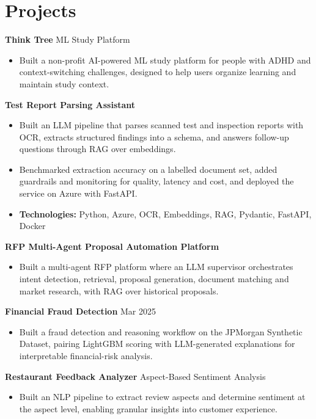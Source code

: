 \documentclass[10pt,a4paper]{article}
\begin{document}
\section{Projects}
\textbf{Think Tree} \textbar{} ML Study Platform\par
\begin{itemize}
  \item Built a non-profit AI-powered ML study platform for people with ADHD and context-switching challenges, designed to help users organize learning and maintain study context.
\end{itemize}
\textbf{Test Report Parsing Assistant}\par
\begin{itemize}
  \item Built an LLM pipeline that parses scanned test and inspection reports with OCR, extracts structured findings into a schema, and answers follow-up questions through RAG over embeddings.
  \item Benchmarked extraction accuracy on a labelled document set, added guardrails and monitoring for quality, latency and cost, and deployed the service on Azure with FastAPI.
  \item \textbf{Technologies:} Python, Azure, OCR, Embeddings, RAG, Pydantic, FastAPI, Docker
\end{itemize}
\textbf{RFP Multi-Agent Proposal Automation Platform}\par
\begin{itemize}
  \item Built a multi-agent RFP platform where an LLM supervisor orchestrates intent detection, retrieval, proposal generation, document matching and market research, with RAG over historical proposals.
\end{itemize}
\textbf{Financial Fraud Detection} \textbar{} Mar 2025\par
\begin{itemize}
  \item Built a fraud detection and reasoning workflow on the JPMorgan Synthetic Dataset, pairing LightGBM scoring with LLM-generated explanations for interpretable financial-risk analysis.
\end{itemize}
\textbf{Restaurant Feedback Analyzer} \textbar{} Aspect-Based Sentiment Analysis\par
\begin{itemize}
  \item Built an NLP pipeline to extract review aspects and determine sentiment at the aspect level, enabling granular insights into customer experience.
\end{itemize}
\end{document}
